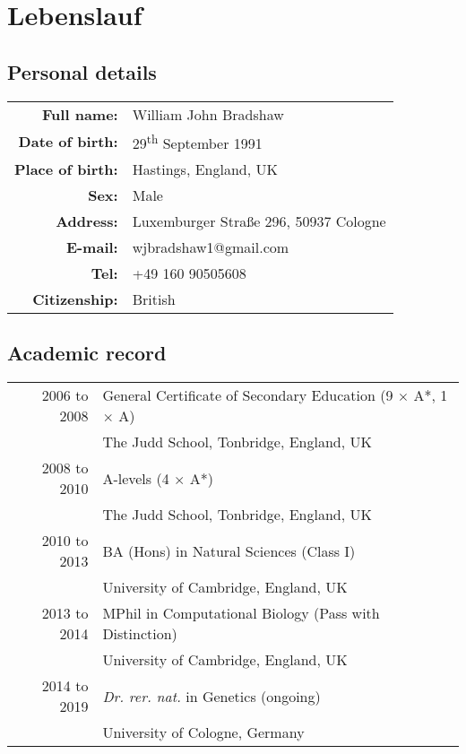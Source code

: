 
\cleardoublepage
\setsinglecolumn
\chapter*{\centering \LARGE Lebenslauf}
\pagestyle{empty}

\section*{Personal details}
\begin{tabular}{>{\bfseries}rl}
Full name: & William John Bradshaw\\
Date of birth: & 29\textsuperscript{th} September 1991\\
Place of birth: & Hastings, England, UK\\
Sex: & Male\\
Address: & Luxemburger Stra\ss{}e 296, 50937 Cologne\\
E-mail: & wjbradshaw1@gmail.com\\
Tel: & +49 160 90505608\\
Citizenship: & British
\end{tabular}

\section*{Academic record}
\begin{tabular}{rl}
2006 to 2008 & General Certificate of Secondary Education (9 $\times$ A*, 1 $\times$ A)\\
& The Judd School, Tonbridge, England, UK\\
2008 to 2010 & A-levels (4 $\times$ A*)\\
& The Judd School, Tonbridge, England, UK\\
2010 to 2013 & BA (Hons) in Natural Sciences (Class I)\\
& University of Cambridge, England, UK\\
2013 to 2014 & MPhil in Computational Biology (Pass with Distinction)\\
& University of Cambridge, England, UK\\
2014 to 2019 & \textit{Dr. rer. nat.} in Genetics (ongoing)\\
& University of Cologne, Germany
\end{tabular}
\declare{6em}